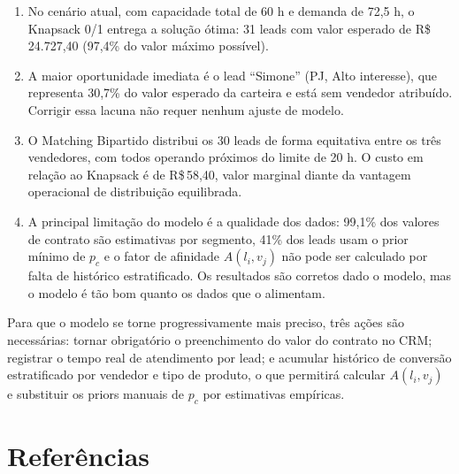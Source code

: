 \documentclass[12pt,a4paper]{article}
\begin{document}
\begin{enumerate}[label=\roman*.]
  \item No cen\'{a}rio atual, com capacidade total de 60 h e demanda de 72,5 h,
        o Knapsack 0/1 entrega a solu\c{c}\~{a}o \'{o}tima: 31 leads com valor esperado
        de R\$\,24.727,40 (97,4\% do valor m\'{a}ximo poss\'{i}vel).

  \item A maior oportunidade imediata \'{e} o lead ``Simone'' (PJ, Alto interesse),
        que representa 30,7\% do valor esperado da carteira e est\'{a} sem vendedor
        atribu\'{i}do. Corrigir essa lacuna n\~{a}o requer nenhum ajuste de modelo.

  \item O Matching Bipartido distribui os 30 leads de forma equitativa entre os
        tr\^{e}s vendedores, com todos operando pr\'{o}ximos do limite de 20 h. O custo
        em rela\c{c}\~{a}o ao Knapsack \'{e} de R\$\,58,40, valor marginal diante da
        vantagem operacional de distribui\c{c}\~{a}o equilibrada.

  \item A principal limita\c{c}\~{a}o do modelo \'{e} a qualidade dos dados: 99,1\% dos
        valores de contrato s\~{a}o estimativas por segmento, 41\% dos leads usam
        o prior m\'{i}nimo de $p_c$ e o fator de afinidade $A(l_i, v_j)$ n\~{a}o pode
        ser calculado por falta de hist\'{o}rico estratificado. Os resultados s\~{a}o
        corretos dado o modelo, mas o modelo \'{e} t\~{a}o bom quanto os dados que o
        alimentam.
\end{enumerate}

Para que o modelo se torne progressivamente mais preciso, tr\^{e}s a\c{c}\~{o}es s\~{a}o
necess\'{a}rias: tornar obrigat\'{o}rio o preenchimento do valor do contrato no CRM;
registrar o tempo real de atendimento por lead; e acumular hist\'{o}rico de
convers\~{a}o estratificado por vendedor e tipo de produto, o que permitir\'{a}
calcular $A(l_i, v_j)$ e substituir os priors manuais de $p_c$ por estimativas
emp\'{i}ricas.

\section*{Refer\^{e}ncias}
\end{document}
